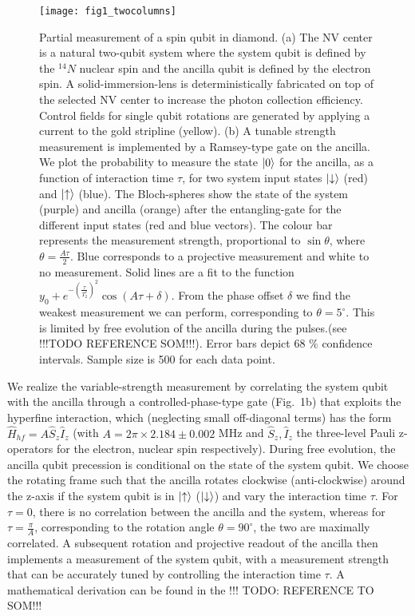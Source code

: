 \begin{figure*}
	\texttt{[image: fig1\_twocolumns]}
	\caption{\label{fig1}Partial measurement of a spin qubit in diamond. (a) The NV center is a natural two-qubit system where the system qubit is defined by the $^{14}N$ nuclear spin and the ancilla qubit is defined by the electron spin. A solid-immersion-lens is deterministically fabricated on top of the selected NV center to increase the photon collection efficiency. Control fields for single qubit rotations are generated by applying a current to the gold stripline (yellow).  (b) A tunable strength measurement is implemented by a Ramsey-type gate on the ancilla. We plot the probability to measure the state $\left|0\right\rangle$  for the ancilla, as a function of interaction time $\tau$, for two system input states $\left|\downarrow\right\rangle$ (red) and $\left|\uparrow\right\rangle$ (blue). The Bloch-spheres show the state of the system (purple) and ancilla (orange) after the entangling-gate for the different input states (red and blue vectors). The colour bar represents the measurement strength, proportional to $\sin{\theta}$, where $\theta=\frac{A \tau}{2}$. Blue corresponds to a projective measurement and white to no measurement. Solid lines are a  fit to the function $y_0 + e^{-( \frac{\tau}{T_2^*})^2} \cos{(A \tau + \delta)} $. From the phase offset $\delta$ we find the weakest measurement we can perform, corresponding to $\theta = 5^{\circ}$. This is limited by free evolution of the ancilla during the pulses.(see !!!TODO REFERENCE SOM!!!). Error bars depict 68 $\%$ confidence intervals. Sample size is 500 for each data point. }
\end{figure*}

We realize the variable-strength measurement by correlating the system qubit with the ancilla through a controlled-phase-type gate (Fig.~1b) that exploits the hyperfine interaction, which (neglecting small off-diagonal terms) has the form $\hat{H}_{hf}=A\hat{S}_{z}\hat{I}_{z}$ (with $A = 2 \pi \times 2.184 \pm 0.002$ MHz and $\hat{S}_{z}, \hat{I}_{z}$ the three-level Pauli z-operators for the electron, nuclear spin respectively).  During free evolution, the ancilla qubit precession is conditional on the state of the system qubit. We choose the rotating frame such that the ancilla rotates clockwise (anti-clockwise) around the z-axis if the system qubit is in $\left|\uparrow\right\rangle$ ($\left|\downarrow\right\rangle$) and vary the interaction time $\tau$. For $\tau = 0$, there is no correlation between the ancilla and the system, whereas for $\tau = \frac{\pi}{A}$, corresponding to the rotation angle $\theta = 90^{\circ}$, the two are maximally correlated. A subsequent rotation and projective readout of the ancilla then implements a measurement of the system qubit, with a measurement strength that can be accurately tuned by controlling the interaction time $\tau$. A mathematical derivation  can be found in the !!! TODO: REFERENCE TO SOM!!!

